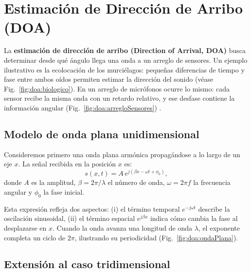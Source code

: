 \section{Estimación de Dirección de Arribo (DOA)}\label{sec:doa} 

La \textbf{estimación de dirección de arribo (Direction of Arrival, DOA)} busca determinar 
desde qué ángulo llega una onda a un arreglo de sensores.  
Un ejemplo ilustrativo es la ecolocación de los murciélagos: 
pequeñas diferencias de tiempo y fase entre ambos oídos permiten estimar 
la dirección del sonido (véase Fig.~\ref{fig:doa:biologico}).  
En un arreglo de micrófonos ocurre lo mismo: 
cada sensor recibe la misma onda con un retardo relativo, 
y ese desfase contiene la información angular (Fig.~\ref{fig:doa:arregloSensores}) \cite{YangBook}.


\subsection{Modelo de onda plana unidimensional}

Consideremos primero una onda plana armónica propagándose a lo largo de un eje \(x\). 
La señal recibida en la posición \(x\) es:
\begin{equation}
	s(x,t) = A \, e^{j(\beta x - \omega t + \phi_0)},
\end{equation}
donde \(A\) es la amplitud, \(\beta=2\pi/\lambda\) el número de onda, 
\(\omega=2\pi f\) la frecuencia angular y \(\phi_0\) la fase inicial.  

Esta expresión refleja dos aspectos:  
(i) el término temporal \(e^{-j\omega t}\) describe la oscilación sinusoidal,  
(ii) el término espacial \(e^{j\beta x}\) indica cómo cambia la fase al desplazarse en \(x\).  
Cuando la onda avanza una longitud de onda \(\lambda\), 
el exponente completa un ciclo de \(2\pi\), ilustrando su periodicidad (Fig.~\ref{fig:doa:ondaPlana}).  


\subsection{Extensión al caso tridimensional}

